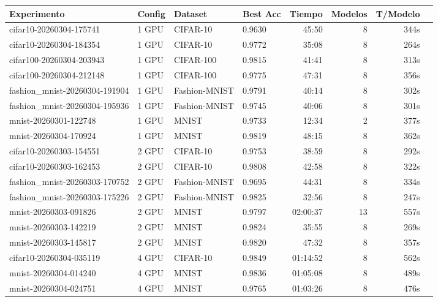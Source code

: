 \begin{tabular}{llllrrrr}
\toprule
Experimento & Config & Dataset & Best Acc & Tiempo & Modelos & T/Modelo \\
\midrule
cifar10-20260304-175741 & 1 GPU & CIFAR-10 & 0.9630 & 45:50 & 8 & 344s \\
cifar10-20260304-184354 & 1 GPU & CIFAR-10 & 0.9772 & 35:08 & 8 & 264s \\
cifar100-20260304-203943 & 1 GPU & CIFAR-100 & 0.9815 & 41:41 & 8 & 313s \\
cifar100-20260304-212148 & 1 GPU & CIFAR-100 & 0.9775 & 47:31 & 8 & 356s \\
fashion_mnist-20260304-191904 & 1 GPU & Fashion-MNIST & 0.9791 & 40:14 & 8 & 302s \\
fashion_mnist-20260304-195936 & 1 GPU & Fashion-MNIST & 0.9745 & 40:06 & 8 & 301s \\
mnist-20260301-122748 & 1 GPU & MNIST & 0.9733 & 12:34 & 2 & 377s \\
mnist-20260304-170924 & 1 GPU & MNIST & 0.9819 & 48:15 & 8 & 362s \\
\midrule
cifar10-20260303-154551 & 2 GPU & CIFAR-10 & 0.9753 & 38:59 & 8 & 292s \\
cifar10-20260303-162453 & 2 GPU & CIFAR-10 & 0.9808 & 42:58 & 8 & 322s \\
fashion_mnist-20260303-170752 & 2 GPU & Fashion-MNIST & 0.9695 & 44:31 & 8 & 334s \\
fashion_mnist-20260303-175226 & 2 GPU & Fashion-MNIST & 0.9825 & 32:56 & 8 & 247s \\
mnist-20260303-091826 & 2 GPU & MNIST & 0.9797 & 02:00:37 & 13 & 557s \\
mnist-20260303-142219 & 2 GPU & MNIST & 0.9824 & 35:55 & 8 & 269s \\
mnist-20260303-145817 & 2 GPU & MNIST & 0.9820 & 47:32 & 8 & 357s \\
\midrule
cifar10-20260304-035119 & 4 GPU & CIFAR-10 & 0.9849 & 01:14:52 & 8 & 562s \\
mnist-20260304-014240 & 4 GPU & MNIST & 0.9836 & 01:05:08 & 8 & 489s \\
mnist-20260304-024751 & 4 GPU & MNIST & 0.9765 & 01:03:26 & 8 & 476s \\
\midrule
\bottomrule
\end{tabular}